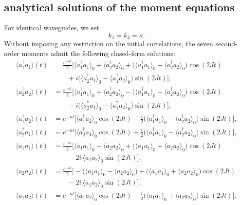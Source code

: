 \subsection{analytical solutions of the moment equations}

For identical waveguides, we set
\begin{equation}
	k_1 = k_2 = \kappa .
\end{equation}
Without imposing any restriction on the initial correlations, the seven second-order
moments admit the following closed-form solutions:
\begin{align}
	\langle a_1^\dagger a_1\rangle(t)
	&= \frac{e^{-\kappa t}}{2}\Big[
	\langle a_1^\dagger a_1\rangle_0+\langle a_2^\dagger a_2\rangle_0
	+ \big(\langle a_1^\dagger a_1\rangle_0-\langle a_2^\dagger a_2\rangle_0\big)\cos(2Jt)
	\nonumber\\
	&\qquad
	+ i\big(\langle a_2^\dagger a_1\rangle_0-\langle a_1^\dagger a_2\rangle_0\big)\sin(2Jt)
	\Big], \\[8pt]
	\langle a_2^\dagger a_2\rangle(t)
	&= \frac{e^{-\kappa t}}{2}\Big[
	\langle a_1^\dagger a_1\rangle_0+\langle a_2^\dagger a_2\rangle_0
	- \big(\langle a_1^\dagger a_1\rangle_0-\langle a_2^\dagger a_2\rangle_0\big)\cos(2Jt)
	\nonumber\\
	&\qquad
	- i\big(\langle a_2^\dagger a_1\rangle_0-\langle a_1^\dagger a_2\rangle_0\big)\sin(2Jt)
	\Big], \\[10pt]
	\langle a_1^\dagger a_2\rangle(t)
	&= e^{-\kappa t}\Big[
	\langle a_1^\dagger a_2\rangle_0\cos(2Jt)
	- \frac{i}{2}\big(\langle a_1^\dagger a_1\rangle_0-\langle a_2^\dagger a_2\rangle_0\big)\sin(2Jt)
	\Big], \\[10pt]
	\langle a_2^\dagger a_1\rangle(t)
	&= e^{-\kappa t}\Big[
	\langle a_2^\dagger a_1\rangle_0\cos(2Jt)
	+ \frac{i}{2}\big(\langle a_1^\dagger a_1\rangle_0-\langle a_2^\dagger a_2\rangle_0\big)\sin(2Jt)
	\Big], \\[10pt]
	\langle a_1 a_1\rangle(t)
	&= \frac{e^{-\kappa t}}{2}\Big[
	\langle a_1 a_1\rangle_0-\langle a_2 a_2\rangle_0
	+ \big(\langle a_1 a_1\rangle_0+\langle a_2 a_2\rangle_0\big)\cos(2Jt)
	\nonumber\\
	&\qquad
	- 2i\,\langle a_1 a_2\rangle_0\sin(2Jt)
	\Big], \\[8pt]
	\langle a_2 a_2\rangle(t)
	&= \frac{e^{-\kappa t}}{2}\Big[
	-\big(\langle a_1 a_1\rangle_0-\langle a_2 a_2\rangle_0\big)
	+ \big(\langle a_1 a_1\rangle_0+\langle a_2 a_2\rangle_0\big)\cos(2Jt)
	\nonumber\\
	&\qquad
	- 2i\,\langle a_1 a_2\rangle_0\sin(2Jt)
	\Big], \\[10pt]
	\langle a_1 a_2\rangle(t)
	&= e^{-\kappa t}\Big[
	\langle a_1 a_2\rangle_0\cos(2Jt)
	- \frac{i}{2}\big(\langle a_1 a_1\rangle_0+\langle a_2 a_2\rangle_0\big)\sin(2Jt)
	\Big].
\end{align}






